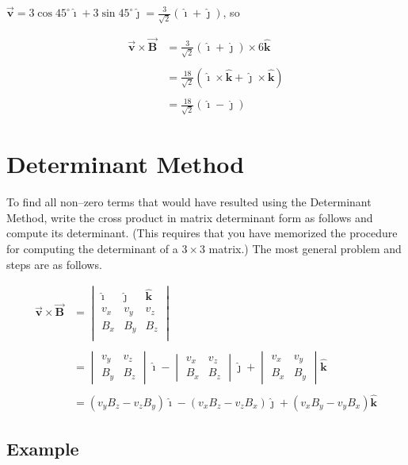 \documentclass{article}
\newcommand{\ds}[0]{\displaystyle}
\newcommand{\ihat}[0]{\hat{\boldsymbol{\imath}}}
\newcommand{\jhat}[0]{\hat{\boldsymbol{\jmath}}}
\newcommand{\khat}[0]{\hat{\boldsymbol{k}}}
\newcommand{\bfvec}[1]{\vec{\mathbf{#1}}}
\begin{document}
$\bfvec{v}=3\cos 45^\circ\ihat + 3\sin 45^\circ\jhat = \ds \frac{3}{\sqrt{2}}(\ihat+\jhat)$, so

$$
  \begin{align*}
   \bfvec{v}\times\bfvec{B} & = \frac{3}{\sqrt{2}}(\ihat+\jhat)\times 6\khat \\\\
   & = \frac{18}{\sqrt{2}}(\ihat\times\khat + \jhat\times\khat) \\\\
   & = \frac{18}{\sqrt{2}}(\ihat - \jhat)
  \end{align*}
  $$
\else

\newpage
\fi

\section{Determinant Method}

To find all non--zero terms that would have resulted using the Determinant Method, write the cross product in matrix determinant form as follows and compute its determinant. (This requires that you have memorized the procedure for computing the determinant of a $3\times 3$ matrix.) The most general problem and steps are as follows.

$$
\begin{align*}
\bfvec{v}\times\bfvec{B}
&=
\begin{vmatrix}
\ihat&\jhat&\khat\\
v_x&v_y&v_z\\
B_x&B_y&B_z\\
\end{vmatrix}
\\\\ &=
\begin{vmatrix}
v_y & v_z \\
B_y & B_z 
\end{vmatrix} \ihat - \begin{vmatrix}
v_x & v_z \\
B_x & B_z 
\end{vmatrix} \jhat +  \begin{vmatrix}
v_x & v_y \\
B_x & B_y 
\end{vmatrix} \khat
\\\\ &=
(v_yB_z - v_zB_y)\ihat -(v_xB_z - v_zB_x)\jhat +(v_xB_y - v_yB_x)\khat
\end{align*}
$$

\subsection{Example}
\end{document}
